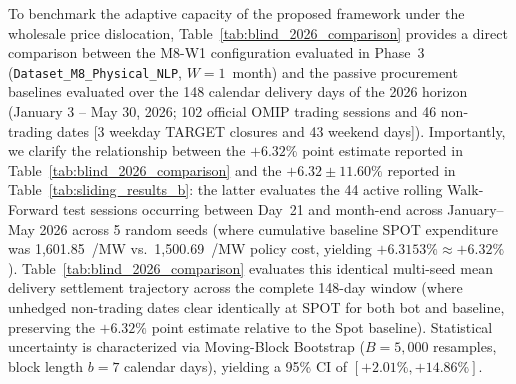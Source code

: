 To benchmark the adaptive capacity of the proposed framework under the wholesale price dislocation, Table~\ref{tab:blind_2026_comparison} provides a direct comparison between the M8-W1 configuration evaluated in Phase~3 (\texttt{Dataset\_\allowbreak M8\_\allowbreak Physical\_\allowbreak NLP}, $W=1$~month) and the passive procurement baselines evaluated over the 148 calendar delivery days of the 2026 horizon (January 3 -- May 30, 2026; 102 official OMIP trading sessions and 46 non-trading dates [3 weekday TARGET closures and 43 weekend days]). Importantly, we clarify the relationship between the $+6.32\%$ point estimate reported in Table~\ref{tab:blind_2026_comparison} and the $+6.32 \pm 11.60\%$ reported in Table~\ref{tab:sliding_results_b}: the latter evaluates the 44 active rolling Walk-Forward test sessions occurring between Day~21 and month-end across January--May 2026 across 5 random seeds (where cumulative baseline SPOT expenditure was 1,601.85~\texteuro/MW vs.\ 1,500.69~\texteuro/MW policy cost, yielding $+6.3153\% \approx +6.32\%$). Table~\ref{tab:blind_2026_comparison} evaluates this identical multi-seed mean delivery settlement trajectory across the complete 148-day window (where unhedged non-trading dates clear identically at SPOT for both bot and baseline, preserving the $+6.32\%$ point estimate relative to the Spot baseline). Statistical uncertainty is characterized via Moving-Block Bootstrap ($B = 5{,}000$ resamples, block length $b = 7$ calendar days), yielding a 95\% CI of $[+2.01\%, +14.86\%]$.

